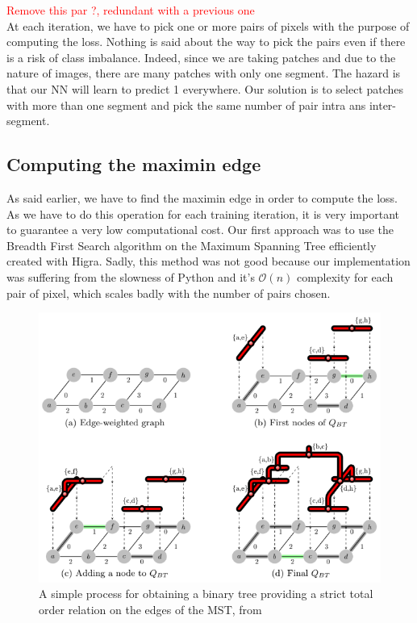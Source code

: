 \textcolor{red}{Remove this par ?, redundant with a previous one}\\
At each iteration, we have to pick one or more pairs of pixels with the purpose
of computing the loss. Nothing is said about the way to pick the pairs even if
there is a risk of class imbalance. Indeed, since we are taking patches and due
to the nature of images, there are many patches with only one segment. The
hazard is that our NN will learn to predict 1 everywhere. Our solution is to
select patches with more than one segment and pick the same number of pair
intra ans inter-segment.\\

\subsection{Computing the maximin edge}

As said earlier, we have to find the maximin edge in order to compute the loss.
As we have to do this operation for each training iteration, it is very important to
guarantee a very low computational cost. Our first approach was to use the
Breadth First Search algorithm on the Maximum Spanning Tree efficiently created
with Higra. Sadly, this method was not good because our implementation was
suffering from the slowness of Python and it's $\mathcal{O}(n)$ complexity for each pair of
pixel, which scales badly with the number of pairs chosen. \\

\begin{figure}[!htbp]
	\centering
	\includegraphics[width=0.7\linewidth]{./images/bpt.png}
	\caption{A simple process for obtaining a binary tree providing a strict
	total order relation on the edges of the MST, from~\cite{najman_playing_2013}}%
	\label{fig:bpt_method}
\end{figure}


